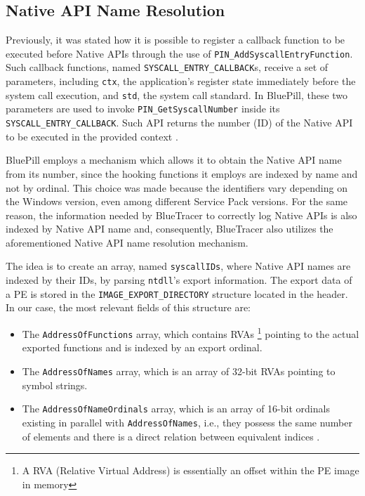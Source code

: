 \subsection{Native API Name Resolution}

Previously, it was stated how it is possible to register a callback function to be executed before Native APIs through the use of \texttt{PIN\_AddSyscallEntryFunction}. Such callback functions, named \texttt{SYSCALL\_ENTRY\_CALLBACK}s, receive a set of parameters, including \texttt{ctx}, the application's register state immediately before the system call execution, and \texttt{std}, the system call standard. In BluePill, these two parameters are used to invoke \texttt{PIN\_GetSyscallNumber} inside its \texttt{SYSCALL\_ENTRY\_CALLBACK}. Such API returns the number (ID) of the Native API to be executed in the provided context \cite{Pin}.

BluePill employs a mechanism which allows it to obtain the Native API name from its number, since the hooking functions it employs are indexed by name and not by ordinal. This choice was made because the identifiers vary depending on the Windows version, even among different Service Pack versions. For the same reason, the information needed by BlueTracer to correctly log Native APIs is also indexed by Native API name and, consequently, BlueTracer also utilizes the aforementioned Native API name resolution mechanism.

The idea is to create an array, named \texttt{syscallIDs}, where Native API names are indexed by their IDs, by parsing \texttt{ntdll}'s export information. The export data of a PE is stored in the \texttt{IMAGE\_EXPORT\_DIRECTORY} structure located in the header. In our case, the most relevant fields of this structure are:

\begin{itemize}
\item The \texttt{AddressOfFunctions} array, which contains RVAs \footnote{A RVA (Relative Virtual Address) is essentially an offset within the PE image in memory} pointing to the actual exported functions and is indexed by an export ordinal.
\item The \texttt{AddressOfNames} array, which is an array of 32-bit RVAs pointing to symbol strings.
\item The \texttt{AddressOfNameOrdinals} array, which is an array of 16-bit ordinals existing in parallel with \texttt{AddressOfNames}, i.e., they possess the same number of elements and there is a direct relation between equivalent indices \cite{Sikorski:2012:PMA:2181153}.  
\end{itemize}

